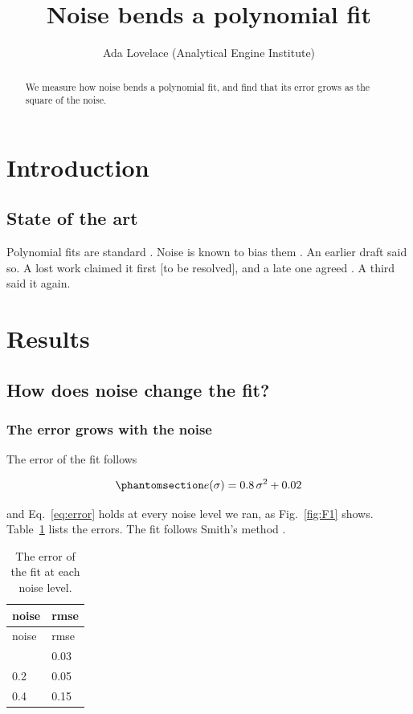 \documentclass[
]{testconf}
\title{Noise bends a polynomial fit}
\author{Ada Lovelace (Analytical Engine Institute)}
\date{}
\begin{document}
\maketitle
\begin{abstract}
We measure how noise bends a polynomial fit, and find that its error
grows as the square of the noise.
\end{abstract}

\section{Introduction}\label{introduction}

\subsection{State of the art}\label{introduction-state-of-the-art}

Polynomial fits are standard \citep{smith-2020-fits, jones-2019-least}.
Noise is known to bias them \citep{lee-2018-noise}. An earlier draft
said so. A lost work claimed it first {[}to be resolved{]}, and a late
one agreed \citep{late-work}. A third said it again.

\section{Results}\label{results}

\subsection{How does noise change the fit?}\label{O1}

\subsubsection{The error grows with the noise}\label{R1}

The error of the fit follows

\begin{equation}\protect\phantomsection\label{eq:error}{ e(\sigma) = 0.8\,\sigma^2 + 0.02 }\end{equation}

and Eq.~\ref{eq:error} holds at every noise level we ran, as
Fig.~\ref{fig:F1} shows. Table~\ref{tbl:T1} lists the errors. The fit
follows Smith's method \citep{smith-2020-fits}.

\begin{longtable}[]{@{}ll@{}}
\caption{The error of the fit at each noise
level.}\label{tbl:T1}\tabularnewline
\toprule\noalign{}
noise & rmse \\
\midrule\noalign{}
\endfirsthead
\toprule\noalign{}
noise & rmse \\
\midrule\noalign{}
\endhead
\bottomrule\noalign{}
\endlastfoot
0.1 & 0.03 \\
0.2 & 0.05 \\
0.4 & 0.15 \\
\end{longtable}
\end{document}
